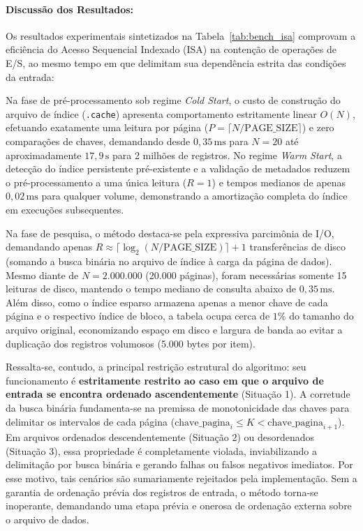 \documentclass[12pt,a4paper]{article}
\begin{document}
\paragraph{Discussão dos Resultados:}
Os resultados experimentais sintetizados na Tabela~\ref{tab:bench_isa} comprovam a eficiência do Acesso Sequencial Indexado (ISA) na contenção de operações de E/S, ao mesmo tempo em que delimitam sua dependência estrita das condições da entrada:

Na fase de pré-processamento sob regime \textit{Cold Start}, o custo de construção do arquivo de índice (\texttt{.cache}) apresenta comportamento estritamente linear $O(N)$, efetuando exatamente uma leitura por página ($P = \lceil N / \text{PAGE\_SIZE} \rceil$) e zero comparações de chaves, demandando desde $0{,}35\,\text{ms}$ para $N=20$ até aproximadamente $17{,}9\,\text{s}$ para 2 milhões de registros. No regime \textit{Warm Start}, a detecção do índice persistente pré-existente e a validação de metadados reduzem o pré-processamento a uma única leitura ($R = 1$) e tempos medianos de apenas $0{,}02\,\text{ms}$ para qualquer volume, demonstrando a amortização completa do índice em execuções subsequentes.

Na fase de pesquisa, o método destaca-se pela expressiva parcimônia de I/O, demandando apenas $R \approx \lceil \log_2(N / \text{PAGE\_SIZE}) \rceil + 1$ transferências de disco (somando a busca binária no arquivo de índice à carga da página de dados). Mesmo diante de $N=2.000.000$ (20.000 páginas), foram necessárias somente 15 leituras de disco, mantendo o tempo mediano de consulta abaixo de $0{,}35\,\text{ms}$. Além disso, como o índice esparso armazena apenas a menor chave de cada página e o respectivo índice de bloco, a tabela ocupa cerca de $1\%$ do tamanho do arquivo original, economizando espaço em disco e largura de banda ao evitar a duplicação dos registros volumosos (5.000 bytes por item).

Ressalta-se, contudo, a principal restrição estrutural do algoritmo: seu funcionamento é \textbf{estritamente restrito ao caso em que o arquivo de entrada se encontra ordenado ascendentemente} (Situação 1). A corretude da busca binária fundamenta-se na premissa de monotonicidade das chaves para delimitar os intervalos de cada página ($\text{chave\_pagina}_i \le K < \text{chave\_pagina}_{i+1}$). Em arquivos ordenados descendentemente (Situação 2) ou desordenados (Situação 3), essa propriedade é completamente violada, inviabilizando a delimitação por busca binária e gerando falhas ou falsos negativos imediatos. Por esse motivo, tais cenários são sumariamente rejeitados pela implementação. Sem a garantia de ordenação prévia dos registros de entrada, o método torna-se inoperante, demandando uma etapa prévia e onerosa de ordenação externa sobre o arquivo de dados.
\end{document}
